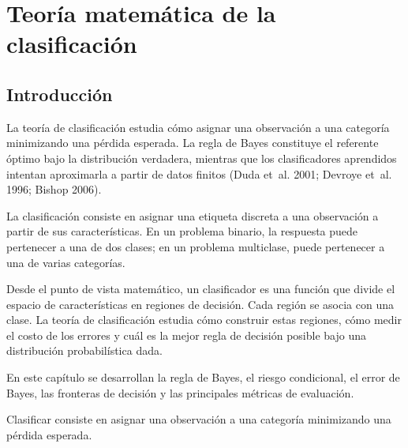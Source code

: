 \documentclass[
  spanish,
  10.5pt,
  letterpaper,
  DIV=11,
  numbers=noendperiod,
  oneside,
  open=any]{scrreprt}
\theoremstyle{definition}
\theoremstyle{definition}
\theoremstyle{plain}
\theoremstyle{remark}
\begin{document}
\chapter{Teoría matemática de la
clasificación}\label{sec-teoria-clasificacion}

\section*{Introducción}\label{introducciuxf3n-6}


La teoría de clasificación estudia cómo asignar una observación a una
categoría minimizando una pérdida esperada. La regla de
Bayes constituye el referente óptimo bajo la
distribución verdadera, mientras que los clasificadores aprendidos
intentan aproximarla a partir de datos finitos (Duda et~al. 2001;
Devroye et~al. 1996; Bishop 2006).

La clasificación consiste en asignar una etiqueta discreta a una
observación a partir de sus características. En un problema binario, la
respuesta puede pertenecer a una de dos clases; en un problema
multiclase, puede pertenecer a una de varias categorías.

Desde el punto de vista matemático, un clasificador es una función que
divide el espacio de características en regiones de decisión. Cada
región se asocia con una clase. La teoría de clasificación estudia cómo
construir estas regiones, cómo medir el costo de los errores y cuál es
la mejor regla de decisión posible bajo una distribución probabilística
dada.

En este capítulo se desarrollan la regla de Bayes, el riesgo
condicional, el error de Bayes, las fronteras de decisión y las
principales métricas de evaluación.

\begin{tcolorbox}[enhanced jigsaw, arc=.35mm, bottomrule=.15mm, bottomtitle=1mm, breakable, colback=white, colbacktitle=quarto-callout-important-color!10!white, colframe=quarto-callout-important-color-frame, coltitle=black, left=2mm, leftrule=.75mm, opacityback=0, opacitybacktitle=0.6, rightrule=.15mm, title=\textcolor{quarto-callout-important-color}{\faExclamation}\hspace{0.5em}{Definición esencial}, titlerule=0mm, toprule=.15mm, toptitle=1mm]

Clasificar consiste en asignar una observación a una categoría
minimizando una pérdida esperada.

\end{tcolorbox}
\end{document}
